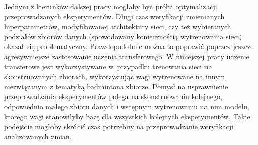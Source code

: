 Jednym z kierunków dalszej pracy mogłaby być próba optymalizacji przeprowadzanych eksperymentów. Długi czas weryfikacji zmienianych hiperparametrów, modyfikowanej architektury sieci, czy też wybieranych podziałów zbiorów danych (spowodowany koniecznością wytrenowania sieci) okazał się problematyczny. Prawdopodobnie można to poprawić poprzez jeszcze agresywniejsze zastosowanie uczenia transferowego. W niniejszej pracy uczenie transferowe jest wykorzystywane w~przypadku trenowania sieci na skonstruowanych zbiorach, wykorzystując wagi wytrenowane na innym, niezwiązanym z tematyką badmintona zbiorze. Pomysł na usprawnienie przeprowadzania eksperymentów polega na skonstruowaniu kolejnego, odpowiednio małego zbioru danych i wstępnym wytrenowaniu na nim modelu, którego wagi stanowiłyby bazę dla wszystkich kolejnych eksperymentów. Takie podejście mogłoby skrócić czas potrzebny na przeprowadzanie weryfikacji analizowanych zmian.
